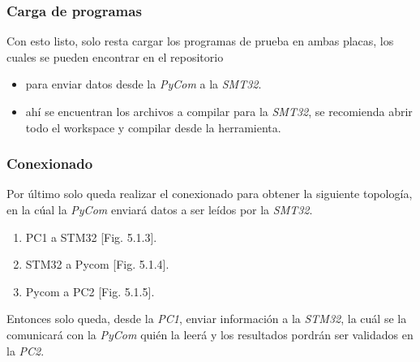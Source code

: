 \documentclass[12pt]{article}
\begin{document}
\subsubsection{Carga de programas}

Con esto listo, solo resta cargar los programas de prueba en ambas placas, los cuales se pueden encontrar en el repositorio
\begin{itemize}
\item {} para enviar datos desde la \textit{PyCom} a la \textit{SMT32}.
\item {} ahí se encuentran los archivos a compilar para la \textit{SMT32}, se recomienda abrir todo el workspace y compilar desde la herramienta.
\end{itemize}

\subsubsection{Conexionado}

Por último solo queda realizar el conexionado para obtener la siguiente topología, en la cúal la \textit{PyCom} enviará datos a ser leídos por la \textit{SMT32}. 

\begin{enumerate}
  \item PC1 a STM32 [Fig. 5.1.3].
  \item STM32 a Pycom  [Fig. 5.1.4].
  \item Pycom a PC2 [Fig. 5.1.5].
\end{enumerate}

Entonces solo queda, desde la \textit{PC1}, enviar información a la \textit{STM32}, la cuál se la comunicará con la \textit{PyCom} quién la leerá y los resultados pordrán ser validados en la \textit{PC2}.
\end{document}
